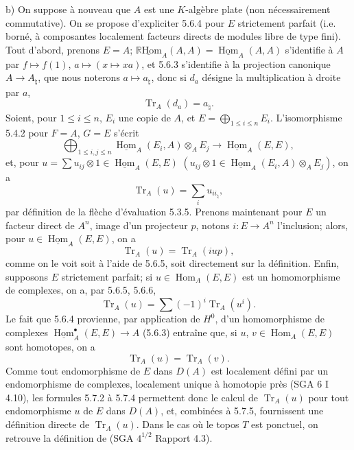 \documentclass[11pt]{article}
\DeclareMathOperator{\Hom}{Hom}
\newcommand{\R}{\mathbb{R}}\newcommand{\RHomCore}{\mathbb{R}\mathrm{Hom}}
\providecommand{\RHom}{\RHomCore}
\providecommand{\uRHom}{\underline{\RHom}}
\providecommand{\uHom}{\underline{\Hom}}
\providecommand{\Tr}{\operatorname{Tr}}
\providecommand{\Tr}{\operatorname{Tr}}
\providecommand{\Tr}{\operatorname{Tr}}
\providecommand{\RHom}{\RHomCore}
\providecommand{\Hom}{\operatorname{Hom}}
\providecommand{\RHom}{\R\mathcal{H}om}
\providecommand{\R}{\mathrm R}
\providecommand{\Tr}{\operatorname{Tr}}
\providecommand{\RHom}{\RHomCore}
\providecommand{\Hom}{\operatorname{Hom}}
\providecommand{\Tr}{\operatorname{Tr}}
\begin{document}
b) On suppose à nouveau que $A$ est une $K$-algèbre plate (non nécessairement commutative). On se propose d'expliciter 5.6.4 pour $E$ strictement parfait (i.e. borné, à composantes localement facteurs directs de modules libre de type fini). Tout d'abord, prenons $E=A$; $\uRHom_A(A,A)=\uHom_A(A,A)$ s'identifie à $A$ par $f\mapsto f(1)$, $a\mapsto(x\mapsto xa)$, et 5.6.3 s'identifie à la projection canonique $A\to A_\natural$, que nous noterons $a\mapsto a_\natural$, donc si $d_a$ désigne la multiplication à droite par $a$,
\begin{equation}\tag{5.7.1}
\Tr_A(d_a)=a_\natural.
\end{equation}
Soient, pour $1\le i\le n$, $E_i$ une copie de $A$, et $E=\bigoplus_{1\le i\le n}E_i$. L'isomorphisme 5.4.2 pour $F=A$, $G=E$ s'écrit
\[
\bigoplus_{1\le i,j\le n}\uHom_A(E_i,A)\otimes_AE_j\longrightarrow\uHom_A(E,E),
\]
et, pour $u=\sum u_{ij}\otimes 1\in\uHom_A(E,E)$ $(u_{ij}\otimes 1\in\uHom_A(E_i,A)\otimes_A E_j)$, on a
\begin{equation}\tag{5.7.2}
\Tr_A(u)=\sum_i u_{ii_\natural},
\end{equation}
par définition de la flèche d'évaluation 5.3.5. Prenons maintenant pour $E$ un facteur direct de $A^n$, image d'un projecteur $p$, notons $i:E\to A^n$ l'inclusion; alors, pour $u\in\uHom_A(E,E)$, on a
\begin{equation}\tag{5.7.3}
\Tr_A(u)=\Tr_A(iup),
\end{equation}
comme on le voit soit à l'aide de 5.6.5, soit directement sur la définition. Enfin, supposons $E$ strictement parfait; si $u\in\Hom_A(E,E)$ est un homomorphisme de complexes, on a, par 5.6.5, 5.6.6,
\begin{equation}\tag{5.7.4}
\Tr_A(u)=\sum(-1)^i\Tr_A(u^i).
\end{equation}
Le
fait que 5.6.4 provienne, par application de $H^0$, d'un homomorphisme de complexes $\uHom_A^\bullet(E,E)\to A$ (5.6.3) entraîne que, si $u$, $v\in\Hom_A(E,E)$ sont homotopes, on a
\begin{equation}\tag{5.7.5}
\Tr_A(u)=\Tr_A(v).
\end{equation}
Comme tout endomorphisme de $E$ dans $D(A)$ est localement défini par un endomorphisme de complexes, localement unique à homotopie près (SGA 6 I 4.10), les formules 5.7.2 à 5.7.4 permettent donc le calcul de $\Tr_A(u)$ pour tout endomorphisme $u$ de $E$ dans $D(A)$, et, combinées à 5.7.5, fournissent une définition directe de $\Tr_A(u)$. Dans le cas où le topos $T$ est ponctuel, on retrouve la définition de (SGA $4^{1/2}$ Rapport 4.3).
\end{document}
